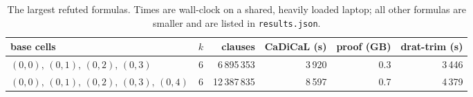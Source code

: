 \begin{table}[ht]
\centering\small
\caption{The largest refuted formulas. Times are wall-clock on a shared, heavily loaded laptop; all other formulas are smaller and are listed in \texttt{results.json}.}\label{tab:drat}
\begin{tabular}{lrrrrr}\toprule
base cells & $k$ & clauses & CaDiCaL (s) & proof (GB) & drat-trim (s)\\\midrule
$(0,0),\,(0,1),\,(0,2),\,(0,3)$ & 6 & 6\,895\,353 & 3\,920 & 0.3 & 3\,446 \\
$(0,0),\,(0,1),\,(0,2),\,(0,3),\,(0,4)$ & 6 & 12\,387\,835 & 8\,597 & 0.7 & 4\,379 \\
\bottomrule\end{tabular}
\end{table}
